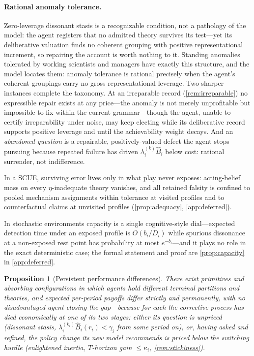 \documentclass[11pt]{article}
\newtheorem{proposition}[assumption]{Proposition}
\theoremstyle{definition}
\begin{document}
\paragraph{Rational anomaly tolerance.}
\label{rem:anomaly}
Zero-leverage dissonant stasis is a recognizable condition, not a pathology of the model: the agent registers that no admitted theory survives its test---yet its deliberative valuation finds no coherent grouping with positive representational increment, so repairing the account is worth nothing to it.
Standing anomalies tolerated by working scientists and managers have exactly this structure, and the model locates them: anomaly tolerance is rational precisely when the agent's coherent groupings carry no gross representational leverage.
Two sharper instances complete the taxonomy.
At an irreparable record (\cref{rem:irreparable}) no expressible repair exists at any price---the anomaly is not merely unprofitable but impossible to fix within the current grammar---though the agent, unable to certify irreparability under noise, may keep electing while its deliberative record supports positive leverage and until the achievability weight decays.
And an \emph{abandoned question} is a repairable, positively-valued defect the agent stops pursuing because repeated failure has driven $\lambda_i^{(k)}\widehat B_i$ below cost: rational surrender, not indifference.

In a SCUE, surviving error lives only in what play never exposes: acting-belief mass on every $\eta$-inadequate theory vanishes, and all retained falsity is confined to pooled mechanism assignments within tolerance at visited profiles and to counterfactual claims at unvisited profiles (\cref{prop:adequacy}, \cref{app:deferred}).

In stochastic environments capacity is a single cognitive-style dial---expected detection time under an exposed profile is $O(b_i/D_i)$ while spurious dissonance at a non-exposed rest point has probability at most $e^{-b_i}$---and it plays no role in the exact deterministic case; the formal statement and proof are \cref{prop:capacity} in \cref{app:deferred}.

\begin{proposition}[Persistent performance differences]
\label{prop:persistence}
There exist primitives and absorbing configurations in which agents hold different terminal partitions and theories, and expected per-period payoffs differ strictly and permanently, with no disadvantaged agent closing the gap---because for each the corrective process has died economically at one of its two stages: either its question is unpriced (\emph{dissonant stasis}, $\lambda_i^{(k_i)}\widehat B_i(r_i)<\gamma_i$ from some period on), or, having asked and refined, the policy change its new model recommends is priced below the switching hurdle (\emph{enlightened inertia}, $T$-horizon gain $\le\kappa_i$, \cref{rem:stickiness}).
\end{proposition}
\end{document}
